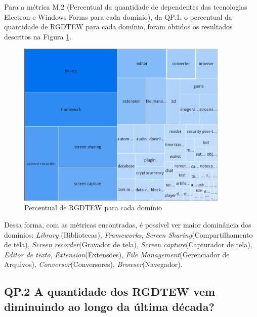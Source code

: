\documentclass[12pt]{article}
\begin{document}
Para a métrica M.2 (Percentual da quantidade de dependentes das tecnologias Electron e Windows Forms para cada domínio), da QP.1, o percentual da quantidade de RGDTEW para cada domínio, foram obtidos os resultados descritos na Figura \ref{fig:Percentual de repositórios por domínio}.
\begin{figure}[ht]
    \centering
    \includegraphics[width=0.9\textwidth]{images/dominios map.png}
    \caption{Percentual de RGDTEW para cada domínio}
    \label{fig:Percentual de repositórios por domínio}
\end{figure}
Dessa forma, com as métricas encontradas, é possível ver maior dominância dos domínios: \emph{Library} (Bibliotecas), \emph{Frameworks}, \emph{Screen Sharing}(Compartilhamento de tela), \emph{Screen recorder}(Gravador de tela), \emph{Screen capture}(Capturador de tela), \emph{Editor de texto}, \emph{Extension}(Extensões), \emph{File Management}(Gerenciador de Arquivos), \emph{Conversor}(Conversores), \emph{Browser}(Navegador).

\subsection{QP.2 A quantidade dos RGDTEW vem diminuindo ao longo da última década?}
\end{document}
